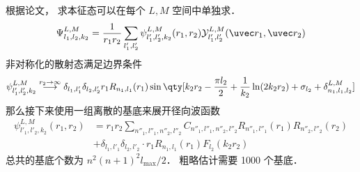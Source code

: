 
根据论文， 求本征态可以在每个 $L,M$ 空间中单独求．
\begin{equation}
\Psi_{l_1,l_2,k_2}^{L,M} = \frac{1}{r_1 r_2}\sum_{l'_1, l'_2}  \psi_{l'_1, l'_2, k_2}^{L, M}(r_1, r_2)\mathcal{Y}_{l'_1, l'_2}^{L, M}(\uvec r_1, \uvec r_2)
\end{equation}
非对称化的散射态满足边界条件
\begin{equation}
\psi_{l'_1,l'_2,k_2}^{L, M} \overset{r_2\to\infty}{\longrightarrow} \delta_{l_1,l'_1}\delta_{l_2,l'_2} r_1 R_{n_1,l_1}(r_1)
\sin\qty[k_2 r_2 - \frac{\pi l_2}{2} +\frac{1}{k_2}\ln(2k_2 r_2) + \sigma_{l_2} + \delta_{n_1,l_1,l_2}^{L,M}]
\end{equation}
那么接下来使用一组离散的基底来展开径向波函数
\begin{equation}
\begin{aligned}
\psi_{l'_1, l'_2,k_2}^{L, M}(r_1, r_2) &= r_1r_2\sum_{n''_1,l''_1,n''_2,l''_2} C_{n''_1,l''_1,n''_2,l''_2} R_{n''_1,l''_1}(r_1) R_{n''_2,l''_2}(r_2)\\
& +\delta_{l_1,l'_1}\delta_{l_2,l'_2} \cdot r_1 R_{n_1,l_1}(r_1) F_{l_2}(k_2 r_2)
\end{aligned}
\end{equation}
总共的基底个数为 $n^2(n+1)^2 l_\text{max}/2$． 粗略估计需要 1000 个基底．
